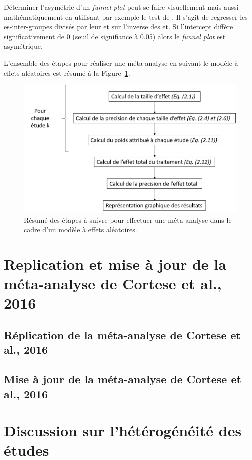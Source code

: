 Déterminer l'asymétrie d'un \textit{funnel plot} peut se faire visuellement mais aussi mathématiquement en utilisant par exemple le test de \citet{Egger1997}. 
Il s'agit de regresser les \gls{es}-inter-groupes divisés par leur \gls{et} sur l'inverse des \gls{et}. Si l'intercept diffère significativement de 
0 (seuil de signifiance à 0.05) alors le \textit{funnel plot} est asymétrique.

L'ensemble des étapes pour réaliser une méta-analyse en suivant le modèle à effets aléatoires est résumé à la Figure~\ref{Figure:pipeline_meta_analyse}.

\begin{figure}[h!]
  \centering
	\includegraphics[width=1.0\linewidth]{figures/chapter-2/pipeline-perform-meta-analysis} 
  \caption{Résumé des étapes à suivre pour effectuer une méta-analyse dans le cadre d'un modèle à effets aléatoires.}
  \label{Figure:pipeline_meta_analyse}
\end{figure}

\section{Replication et mise à jour de la méta-analyse de Cortese et al., 2016} \label{replication_and_update}

\subsection{Réplication de la méta-analyse de Cortese et al., 2016}

\subsection{Mise à jour de la méta-analyse de Cortese et al., 2016}

\section{Discussion sur l'hétérogénéité des études} 